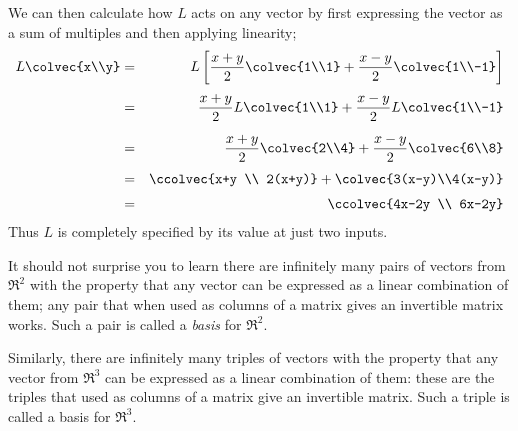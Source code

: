 \begin{example}
\[\]
We can then calculate how $L$ acts on any vector by first expressing the vector as  a sum of multiples and then applying linearity;
\begin{eqnarray*}
L\colvec{x\\y}
&=&L\left[    \frac{x+y}{2} \colvec{1\\1} + \frac{x-y}{2} \colvec{1\\-1}  \right]\\[1mm]
&=&\frac{x+y}{2} L \colvec{1\\1} + \frac{x-y}{2} L \colvec{1\\-1} \\[2mm]
&=&\frac{x+y}{2} \colvec{2\\4} + \frac{x-y}{2}  \colvec{6\\8} \\[1mm]
&=&\ccolvec{x+y \\ 2(x+y)} +  \colvec{3(x-y)\\4(x-y)}\\[1mm]
&=&\ccolvec{4x-2y \\ 6x-2y}
\end{eqnarray*}
Thus $L$ is completely specified by its value at just two inputs. 
\end{example}

It should not surprise you to learn there are infinitely many pairs of vectors from $\Re^2$ 
with the property that any vector can be expressed as a linear combination of them; any pair that when used as columns of a matrix gives an invertible matrix works. Such a pair is called a {\itshape basis} for $\Re^2$.

Similarly, there are infinitely many triples of vectors with the property that any vector from $\Re^3$ can be expressed as a linear combination of them: these are the triples that used as columns of a matrix give an invertible matrix. Such a triple is called a basis for $\Re^3$.

